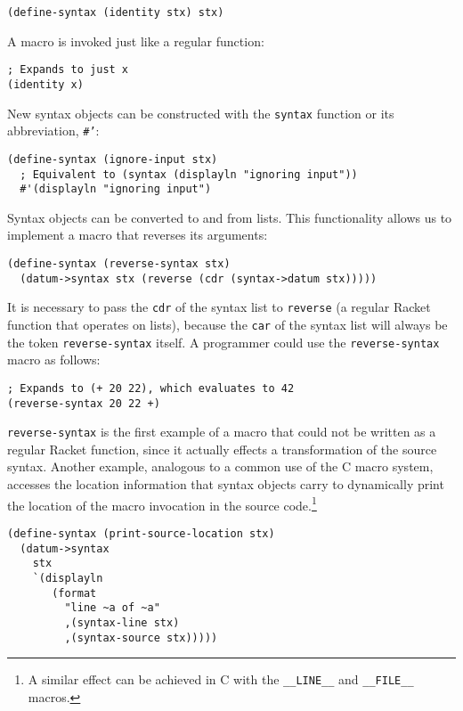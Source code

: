 \documentclass{article}
\begin{document}
\begin{lstlisting}
(define-syntax (identity stx) stx)
\end{lstlisting}

A macro is invoked just like a regular function:

\begin{lstlisting}
; Expands to just x
(identity x)
\end{lstlisting}

New syntax objects can be constructed with the \texttt{syntax} function or its abbreviation, \texttt{\#'}:

\begin{lstlisting}
(define-syntax (ignore-input stx)
  ; Equivalent to (syntax (displayln "ignoring input"))
  #'(displayln "ignoring input")
\end{lstlisting}

Syntax objects can be converted to and from lists. This functionality allows us to implement a macro that reverses its arguments:

\begin{lstlisting}
(define-syntax (reverse-syntax stx)
  (datum->syntax stx (reverse (cdr (syntax->datum stx)))))
\end{lstlisting}

It is necessary to pass the \texttt{cdr} of the syntax list to \texttt{reverse} (a regular Racket function that operates on lists), because the \texttt{car} of the syntax list will always be the token \texttt{reverse-syntax} itself. A programmer could use the \texttt{reverse-syntax} macro as follows:

\begin{lstlisting}
; Expands to (+ 20 22), which evaluates to 42
(reverse-syntax 20 22 +)
\end{lstlisting}

\texttt{reverse-syntax} is the first example of a macro that could not be written as a regular Racket function, since it actually effects a transformation of the source syntax. Another example, analogous to a common use of the C macro system, accesses the location information that syntax objects carry to dynamically print the location of the macro invocation in the source code.\footnote{A similar effect can be achieved in C with the \texttt{\_\_LINE\_\_} and \texttt{\_\_FILE\_\_} macros.}

\begin{lstlisting}
(define-syntax (print-source-location stx)
  (datum->syntax
    stx
    `(displayln
       (format
         "line ~a of ~a"
         ,(syntax-line stx)
         ,(syntax-source stx)))))
\end{lstlisting}
\end{document}
